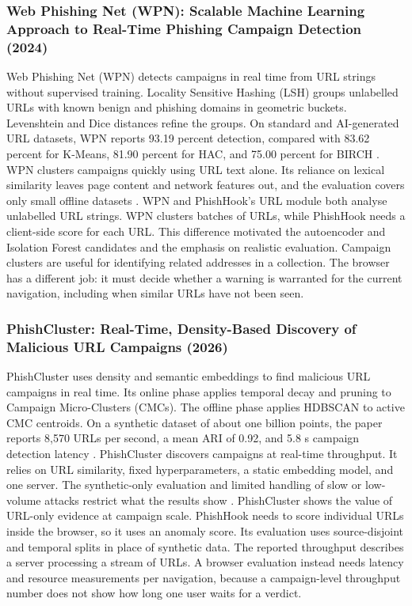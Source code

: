 \documentclass{FastFyp}
\begin{document}
\subsubsection{Web Phishing Net (WPN): Scalable Machine Learning Approach to Real-Time Phishing Campaign Detection (2024)}
Web Phishing Net (WPN) detects campaigns in real time from URL strings without supervised training. Locality Sensitive Hashing (LSH) groups unlabelled URLs with known benign and phishing domains in geometric buckets. Levenshtein and Dice distances refine the groups. On standard and AI-generated URL datasets, WPN reports 93.19 percent detection, compared with 83.62 percent for K-Means, 81.90 percent for HAC, and 75.00 percent for BIRCH \cite{wpn2025}. WPN clusters campaigns quickly using URL text alone. Its reliance on lexical similarity leaves page content and network features out, and the evaluation covers only small offline datasets \cite{wpn2025}. WPN and PhishHook's URL module both analyse unlabelled URL strings. WPN clusters batches of URLs, while PhishHook needs a client-side score for each URL. This difference motivated the autoencoder and Isolation Forest candidates and the emphasis on realistic evaluation. Campaign clusters are useful for identifying related addresses in a collection. The browser has a different job: it must decide whether a warning is warranted for the current navigation, including when similar URLs have not been seen.

\subsubsection{PhishCluster: Real-Time, Density-Based Discovery of Malicious URL Campaigns (2026)}
PhishCluster uses density and semantic embeddings to find malicious URL campaigns in real time. Its online phase applies temporal decay and pruning to Campaign Micro-Clusters (CMCs). The offline phase applies HDBSCAN to active CMC centroids. On a synthetic dataset of about one billion points, the paper reports 8,570 URLs per second, a mean ARI of 0.92, and 5.8 s campaign detection latency \cite{phishcluster2026}. PhishCluster discovers campaigns at real-time throughput. It relies on URL similarity, fixed hyperparameters, a static embedding model, and one server. The synthetic-only evaluation and limited handling of slow or low-volume attacks restrict what the results show \cite{phishcluster2026}. PhishCluster shows the value of URL-only evidence at campaign scale. PhishHook needs to score individual URLs inside the browser, so it uses an anomaly score. Its evaluation uses source-disjoint and temporal splits in place of synthetic data. The reported throughput describes a server processing a stream of URLs. A browser evaluation instead needs latency and resource measurements per navigation, because a campaign-level throughput number does not show how long one user waits for a verdict.
\end{document}
